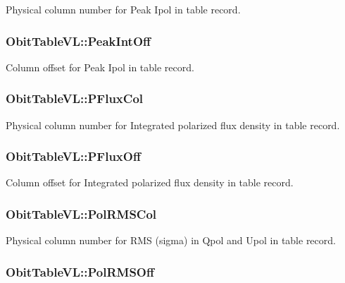 Physical column number for Peak Ipol in table record. 

\subsubsection{ {\bf Obit\-Table\-VL::Peak\-Int\-Off}}\label{structObitTableVL_o49}


Column offset for Peak Ipol in table record. 

\subsubsection{ {\bf Obit\-Table\-VL::PFlux\-Col}}\label{structObitTableVL_o62}


Physical column number for Integrated polarized flux density in table record. 

\subsubsection{ {\bf Obit\-Table\-VL::PFlux\-Off}}\label{structObitTableVL_o61}


Column offset for Integrated polarized flux density in table record. 

\subsubsection{ {\bf Obit\-Table\-VL::Pol\-RMSCol}}\label{structObitTableVL_o66}


Physical column number for RMS (sigma) in Qpol and Upol in table record. 

\subsubsection{ {\bf Obit\-Table\-VL::Pol\-RMSOff}}\label{structObitTableVL_o65}


